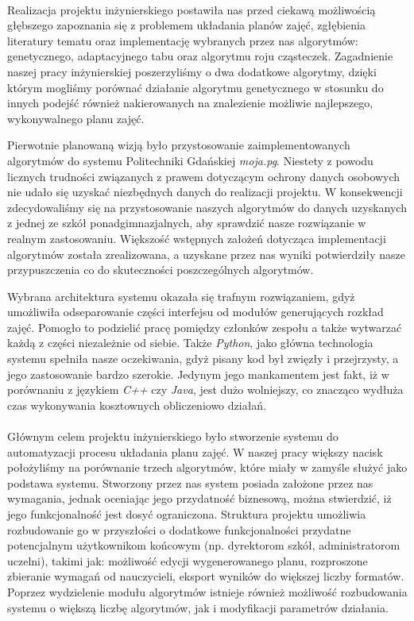 \paragraph{}
\par Realizacja projektu inżynierskiego postawiła nas przed ciekawą możliwością głębszego zapoznania się z problemem układania planów zajęć, zgłębienia literatury tematu oraz implementację wybranych przez nas algorytmów: genetycznego, adaptacyjnego tabu oraz algorytmu roju cząsteczek. Zagadnienie naszej pracy inżynierskiej poszerzyliśmy o dwa dodatkowe algorytmy, dzięki którym mogliśmy porównać działanie algorytmu genetycznego w stosunku do innych podejść również nakierowanych na znalezienie możliwie najlepszego, wykonywalnego planu zajęć.
\par Pierwotnie planowaną wizją było przystosowanie zaimplementowanych algorytmów do systemu Politechniki Gdańskiej \emph{moja.pg}. Niestety z powodu licznych trudności związanych z prawem dotyczącym ochrony danych osobowych nie udało się uzyskać niezbędnych danych do realizacji projektu. W konsekwencji zdecydowaliśmy się na przystosowanie naszych algorytmów do danych uzyskanych z jednej ze szkół ponadgimnazjalnych, aby sprawdzić nasze rozwiązanie w realnym zastosowaniu. Większość wstępnych założeń dotycząca implementacji algorytmów została zrealizowana, a uzyskane przez nas wyniki potwierdziły nasze przypuszczenia co do skuteczności poszczególnych algorytmów.
\par Wybrana architektura systemu okazała się trafnym rozwiązaniem, gdyż umożliwiła odseparowanie części interfejsu od modułów generujących rozkład zajęć. Pomogło to podzielić pracę pomiędzy członków zespołu a także wytwarzać każdą z części niezależnie od siebie. Także \emph{Python}, jako główna technologia systemu spełniła nasze oczekiwania, gdyż pisany kod był zwięzły i przejrzysty, a jego zastosowanie bardzo szerokie. Jedynym jego mankamentem jest fakt, iż w porównaniu z językiem \emph{C++} czy \emph{Java}, jest dużo wolniejszy, co znacząco wydłuża czas wykonywania kosztownych obliczeniowo działań.
\paragraph{}Głównym celem projektu inżynierskiego było stworzenie systemu do automatyzacji procesu układania planu zajęć. W naszej pracy większy nacisk położyliśmy na porównanie trzech algorytmów, które miały w zamyśle służyć jako podstawa systemu. Stworzony przez nas system posiada założone przez nas wymagania, jednak oceniając jego przydatność biznesową, można stwierdzić, iż jego funkcjonalność jest dosyć ograniczona. Struktura projektu umożliwia rozbudowanie go w przyszłości o dodatkowe funkcjonalności przydatne potencjalnym użytkownikom końcowym (np. dyrektorom szkół, administratorom uczelni), takimi jak: możliwość edycji wygenerowanego planu, rozproszone zbieranie wymagań od nauczycieli, eksport wyników do większej liczby formatów. Poprzez wydzielenie modułu algorytmów istnieje również możliwość rozbudowania systemu o większą liczbę algorytmów, jak i modyfikacji parametrów działania. 

